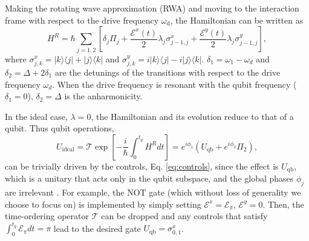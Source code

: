 \documentclass[prl,twocolumn,aps,final,floatfix,superscriptaddress,showpacs]{revtex4}
\newcommand{\bra}[1]{\langle{#1}|}
\newcommand{\ket}[1]{|{#1}\rangle}
\begin{document}
Making the rotating wave approximation (RWA) and moving to the interaction frame with respect to the drive frequency $\omega_\mathrm{d}$, the Hamiltonian can be written as
\begin{equation}\label{eq:RotHam}
	H^R = \hbar\sum_{j=1,2}\left[\delta_{j}\Pi_j + \frac{\mathcal{E}^x(t)}{2}\lambda_j\sigma_{j-1,j}^x+ \frac{\mathcal{E}^y(t)}{2}\lambda_j\sigma_{j-1,j}^y\right],
\end{equation}
where $\sigma_{j,k}^x=\ket{k}\bra{j}+\ket{j}\bra{k}$ and $\sigma_{j,k}^y=i\ket{k}\bra{j}-i\ket{j}\bra{k}$. $\delta_{1} = \omega_{1}-\omega_d$ and $\delta_2=\Delta+2\delta_1$ are the detunings of the transitions with respect to the drive frequency $\omega_d$. When the drive frequency is resonant with the qubit frequency ($\delta_1=0$), $\delta_2=\Delta$ is the anharmonicity. 

In the ideal case, $\lambda=0$, the Hamiltonian and its evolution reduce to that of a qubit.  Thus qubit operations, 
\begin{equation}\label{eq:ideal}
	U_\mathrm{ideal} = \mathcal{T}\exp\left[-\frac{i}{\hbar}\int_{0}^{t_g}H^Rdt\right] = e^{i\phi_1}(U_\mathrm{qb}+e^{i\phi_2}\Pi_2),
\end{equation}  can be trivially driven by the controls, Eq. \eqref{eq:controls}, since  the effect is $U_\mathrm{qb}$, which is a unitary that acts only in the qubit subspace, and the global phases $\phi_j$ are irrelevant \cite{Rebentrost:2008a}.
For example, the NOT gate (which without loss of generality we choose to focus on)  is implemented by simply setting $\mathcal{E}^x=\mathcal{E}_\pi$, $\mathcal{E}^y=0$. Then, the time-ordering operator  $\mathcal{T}$ can be dropped and any controls that satisfy $\int_{0}^{t_g}\mathcal{E}_\pi dt=\pi$ 
lead to the desired gate $U_\mathrm{qb} =\sigma_{0,1}^x$.
\end{document}
